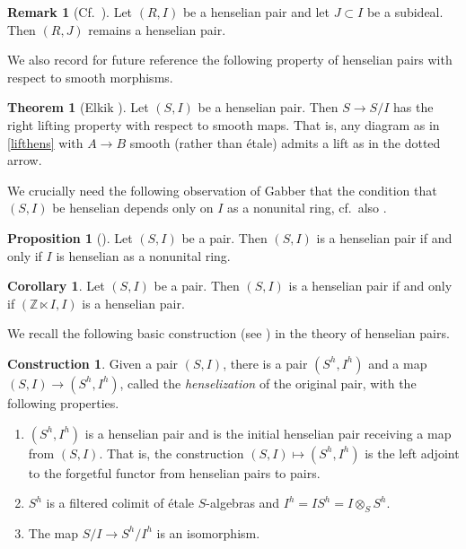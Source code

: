 \documentclass{amsart}
\theoremstyle{definition}
\newtheorem{proposition}[definition]{Proposition}
\newtheorem{corollary}[definition]{Corollary}
\newtheorem{cons}[definition]{Construction}
\newtheorem{remark}[definition]{Remark}
\newtheorem{theorem}[definition]{Theorem}
\begin{document}
\begin{remark}[{Cf.~\cite[Tag 09XD]{stacks-project}}] 
\label{subideal:henspair}
Let $(R, I)$ be a henselian pair and let $J \subset I$ be a subideal. Then $(R,
J)$ remains a henselian pair. 
\end{remark} 

  We also record for future reference the following property of henselian pairs
with respect to smooth morphisms. 

\begin{theorem}[{Elkik \cite[Sec.~II]{elkik}}] 
\label{elkikthm}
Let $(S, I)$ be a henselian pair. Then $S \to S/I$ has the right lifting
property with respect to smooth maps. That is, any diagram as in
\eqref{lifthens} with $A \to B$ smooth (rather than \'etale) admits a lift as in the dotted arrow.
\end{theorem} 

We crucially need the following observation of Gabber that the condition that $(S,
I)$ be henselian depends only on $I$ as a nonunital ring, cf.~also
\cite[Prop.~XI.1]{Raynaud-henselian}. 

\begin{proposition}[{\cite[Prop.~1]{gabber}}] 
\label{checkhensnonunital}
Let $(S, I)$ be  a pair. Then $(S, I)$ is a henselian pair 
if and only if $I$ is henselian as a nonunital ring. 
\end{proposition} 

\begin{corollary} 
Let $(S, I)$ be a pair.  Then $(S, I)$ is a
henselian pair if and only if $(\mathbb{Z} \ltimes I, I)$ is a
henselian pair. 
\end{corollary} 


We recall the following basic construction (see \cite[Tag
0EM7]{stacks-project}) in the theory of henselian pairs. 
\begin{cons}\label{construction_henselization}
Given a pair $(S, I)$, there is a pair $(S^h, I^h)$ and a map $(S, I) \to (S^h,
I^h)$, called the \emph{henselization} of the original pair, with the following properties.
\begin{enumerate}
\item $(S^h, I^h)$ is a henselian pair and is the initial henselian pair
receiving a map from $(S, I)$. That is, the construction $(S, I) \mapsto
(S^h, I^h)$ is the left adjoint 
to the forgetful functor from henselian pairs to pairs. 
\item $S^h$ is a filtered colimit of \'etale $S$-algebras and $I^h = I S^h =
I \otimes_S S^h$.  
\item The map $S/I \to S^h/I^h$ is an isomorphism. 
\end{enumerate}
 
\end{cons}
\end{document}
